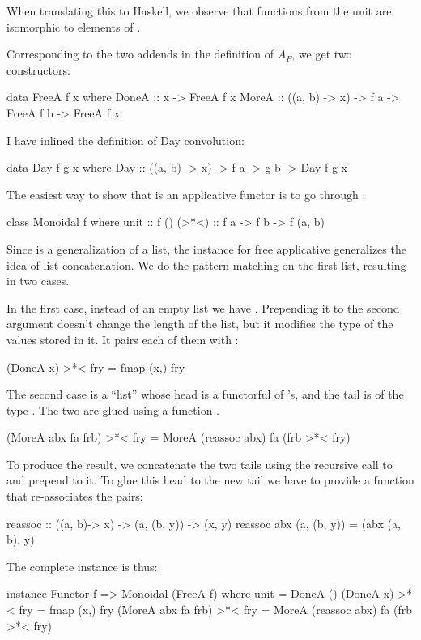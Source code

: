 \documentclass[DaoFP]{subfiles}
\begin{document}
When translating this to Haskell, we observe that functions from the unit  are isomorphic to elements of . 

Corresponding to the two addends in the definition of $A_F$, we get two constructors:
\begin{haskell}
data FreeA f x where
  DoneA :: x -> FreeA f x
  MoreA :: ((a, b) -> x) -> f a -> FreeA f b -> FreeA f x
\end{haskell}
I have inlined the definition of Day convolution:
\begin{haskell}
data Day f g x where
  Day :: ((a, b) -> x) -> f a -> g b -> Day f g x
\end{haskell}

The easiest way to show that  is an applicative functor is to go through :
\begin{haskell}
class Monoidal f where
  unit  :: f ()
  (>*<) :: f a -> f b -> f (a, b)
\end{haskell}

Since  is a generalization of a list, the  instance for free applicative generalizes the idea of list concatenation. We do the pattern matching on the first list, resulting in two cases.

In the first case, instead of an empty list we have . Prepending it to the second argument doesn't change the length of the list, but it modifies the type of the values stored in it. It pairs each of them with :
\begin{haskell}
  (DoneA x) >*< fry = fmap (x,) fry
\end{haskell}

The second case is a ``list'' whose head  is a functorful of 's, and the tail  is of the type . The two are glued using a function . 
\begin{haskell}
  (MoreA abx fa frb) >*< fry = MoreA (reassoc abx) fa (frb >*< fry)
\end{haskell}
To produce the result, we concatenate the two tails using the recursive call to \hask{>*<} and prepend  to it. To glue this head to the new tail we have to provide a function that re-associates the pairs:
\begin{haskell}
reassoc :: ((a, b)-> x) -> (a, (b, y)) -> (x, y)
reassoc abx (a, (b, y)) = (abx (a, b), y)
\end{haskell}

The complete instance is thus:
\begin{haskell}
instance Functor f => Monoidal (FreeA f) where
  unit = DoneA ()
  (DoneA x) >*< fry = fmap (x,) fry
  (MoreA abx fa frb) >*< fry = MoreA (reassoc abx) fa (frb >*< fry)
\end{haskell}
\end{document}
